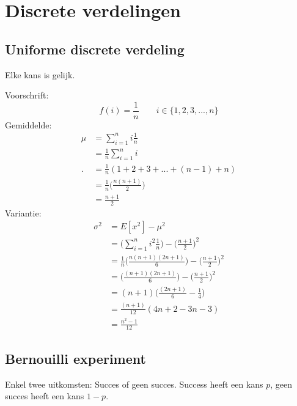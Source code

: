 \documentclass[12pt]{report}
\begin{document}
\chapter{Discrete verdelingen}
\section{Uniforme discrete verdeling}
Elke kans is gelijk.

Voorschrift:
$$f(i) = \frac{1}{n} \qquad i \in \{1, 2, 3, ..., n\}$$
Gemiddelde:
\begin{equation*}
 \begin{split}
  \mu & = \sum_{i = 1}^{n}i \frac{1}{n} \\
      & =  \frac{1}{n} \sum_{i = 1}^{n}i\\.
      & =  \frac{1}{n}(1 + 2 + 3 + ... + (n - 1) + n)\\
      & =  \frac{1}{n}\bigg(\frac{n(n + 1)}{2}\bigg)\\ 
      & = \frac{n + 1}{2}
 \end{split}
\end{equation*}
Variantie:
\begin{equation*}
 \begin{split}
  \sigma^2 & = E[x^2] - \mu^2 \\
           & = \bigg(\sum_{i = 1}^{n}i^2 \frac{1}{n}\bigg) - \bigg(\frac{n + 1}{2}\bigg)^2 \\
           & = \frac{1}{n}\bigg(\frac{n(n+1)(2n+1)}{6}\bigg) - \bigg(\frac{n + 1}{2}\bigg)^2 \\
           & = \bigg(\frac{(n+1)(2n+1)}{6}\bigg) - \bigg(\frac{n + 1}{2}\bigg)^2 \\
           & = (n + 1)\bigg(\frac{(2n+1)}{6} - \frac{1}{4}\bigg) \\
           & = \frac{(n + 1)}{12}(4n + 2 - 3n - 3) \\
           & = \frac{n^2 - 1}{12}
 \end{split}
\end{equation*}
\section{Bernouilli experiment}
Enkel twee uitkomsten: Succes of geen succes. Success heeft een kans $p$, geen succes heeft een kans $ 1 - p$.
\end{document}
